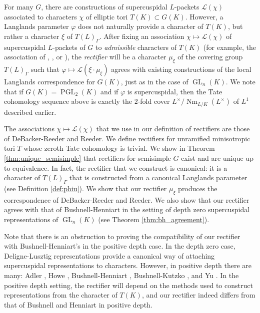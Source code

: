 \documentclass{amsart}
\theoremstyle{plain}
\theoremstyle{definition}
\numberwithin{equation}{section}
\DeclareMathOperator{\Nm}{Nm}
\DeclareMathOperator{\GL}{GL}
\DeclareMathOperator{\PGL}{PGL}
\newcommand{\Lx}{L^\times}
\newcommand{\Lpack}{\mathcal{L}}
\begin{document}
For many $G$,
there are constructions of supercuspidal $L$-packets
$\Lpack(\chi)$ associated to characters $\chi$ of elliptic tori $T(K) \subset G(K)$.  However, a Langlands parameter $\varphi$ does not naturally
provide a character of $T(K)$, but rather a character $\xi$ of
$T(L)_{\Gamma}$.  After fixing an association $\chi \mapsto \Lpack(\chi)$ of supercuspidal $L$-packets of $G$
to \emph{admissible} characters of $T(K)$ (for example, the association of \cite{reeder-debacker:09a}, \cite{kaletha:13a}, or \cite{reeder:08a}), the \emph{rectifier} will be a character
$\mu_{\xi}$ of the covering group $T(L)_{\Gamma}$ such that $\varphi \mapsto \Lpack(\xi \cdot \mu_{\xi})$
agrees with existing constructions of the local Langlands correspondence for $G(K)$, just as in the case of $\GL_n(K)$.  We note that if $G(K) = \PGL_2(K)$ and if $\varphi$ is supercuspidal, then the Tate cohomology sequence above is exactly the $2$-fold cover $\Lx / \Nm_{L/K}(\Lx)$ of $L^1$ described earlier.

The associations $\chi \mapsto \Lpack(\chi)$ that we use in our definition of rectifiers are those of DeBacker-Reeder and Reeder. We define rectifiers for
unramified minisotropic tori $T$ whose zeroth Tate cohomology is trivial.
We show in Theorem \ref{thm:unique_semisimple} that rectifiers for semisimple $G$ exist
and are unique up to equivalence.  In fact, the rectifier that we construct is canonical: it is a character of $T(L)_{\Gamma}$ that is constructed from
a canonical Langlands parameter (see Definition \ref{def:phiu}).  We show that our rectifier $\mu_{\xi}$ produces the correspondence of DeBacker-Reeder and Reeder.  We also show that our rectifier agrees with that of Bushnell-Henniart in the setting of depth zero
supercuspidal representations of $\GL_{n}(K)$ (see Theorem \ref{thm:bh_agreement}).

Note that there is an obstruction to proving the compatibility of our rectifier with Bushnell-Henniart's in the positive depth case.
In the depth zero case, Deligne-Lusztig representations provide a canonical way of
attaching supercuspidal representations to characters. However, in positive depth there are many:
Adler \cite{adler:98a}, Howe \cite{howe:77a}, Bushnell-Henniart \cite{bushnell-henniart:10a},
Bushnell-Kutzko \cite{bushnell-kutzko:AdmissibleDual}, and Yu \cite{yu:03a}.
In the positive depth setting, the rectifier will depend on the methods
used to construct representations from the character of $T(K)$, and
our rectifier indeed differs from that of Bushnell and Henniart in positive depth.
\end{document}
